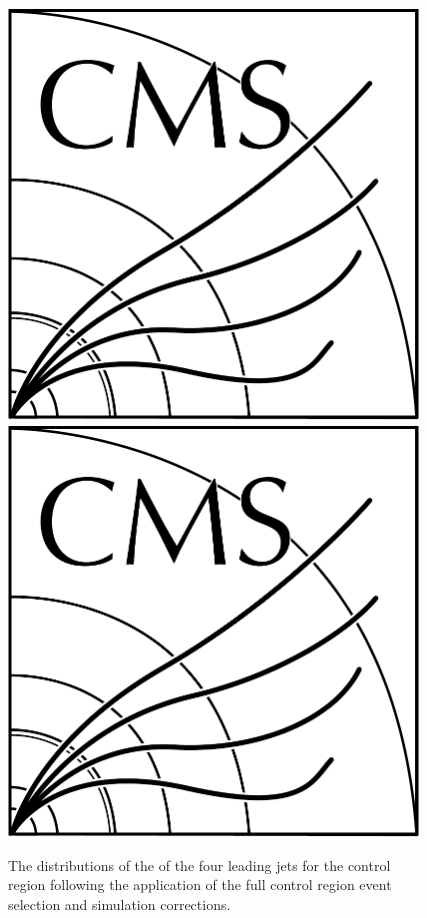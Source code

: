 \begin{figure}[htb]
\includegraphics[width=0.97\textwidth]{CMS-bw-logo.pdf}
\\
\includegraphics[width=0.97\textwidth]{CMS-bw-logo.pdf}
\caption{
The distributions of the \pt of the four leading jets for the \ttbar control region following the application of the full control region event selection and simulation corrections.
}
\label{fig:ttbarCR_jetPt}
\end{figure}

